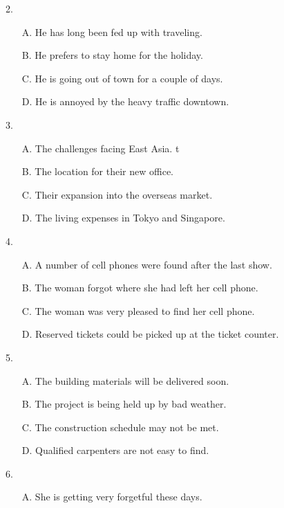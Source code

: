 \documentclass[UTF8,11pt]{ctexart}
\begin{document}
2.


\begin{itemize}[leftmargin=2em,itemsep=.2em,topsep=.4em]\item[A.] He has long been fed up with traveling.
\item[B.] He prefers to stay home for the holiday.
\item[C.] He is going out of town for a couple of days.
\item[D.] He is annoyed by the heavy traffic downtown.
\end{itemize}

3.


\begin{itemize}[leftmargin=2em,itemsep=.2em,topsep=.4em]\item[A.] The challenges facing East Asia. t
\item[B.] The location for their new office.
\item[C.] Their expansion into the overseas market.
\item[D.] The living expenses in Tokyo and Singapore.
\end{itemize}

4.


\begin{itemize}[leftmargin=2em,itemsep=.2em,topsep=.4em]\item[A.] A number of cell phones were found after the last show.
\item[B.] The woman forgot where she had left her cell phone.
\item[C.] The woman was very pleased to find her cell phone.
\item[D.] Reserved tickets could be picked up at the ticket counter.
\end{itemize}

5.


\begin{itemize}[leftmargin=2em,itemsep=.2em,topsep=.4em]\item[A.] The building materials will be delivered soon.
\item[B.] The project is being held up by bad weather.
\item[C.] The construction schedule may not be met.
\item[D.] Qualified carpenters are not easy to find.
\end{itemize}

6.


\begin{itemize}[leftmargin=2em,itemsep=.2em,topsep=.4em]\item[A.] She is getting very forgetful these days.
\end{itemize}
\end{document}
